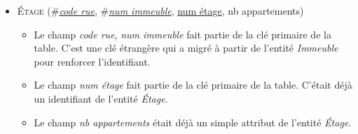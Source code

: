 \documentclass[a4paper]{article}
\newcommand{\relat}[1]{\textsc{#1}}
\newcommand{\attr}[1]{#1}
\newcommand{\prim}[1]{\uline{#1}}
\newcommand{\foreign}[1]{\#\textsl{#1}}
\begin{document}
\begin{itemize}
  \item \relat{Étage} (\foreign{\prim{code rue}}, \foreign{\prim{num immeuble}}, \prim{num étage}, \attr{nb appartements})
  \begin{itemize}
    \item Le champ \emph{code rue}, \emph{num immeuble} fait partie de la clé primaire de la table. C'est une clé étrangère qui a migré à partir de l'entité \emph{Immeuble} pour renforcer l'identifiant.
    \item Le champ \emph{num étage} fait partie de la clé primaire de la table. C'était déjà un identifiant de l'entité \emph{Étage}.
    \item Le champ \emph{nb appartements} était déjà un simple attribut de l'entité \emph{Étage}.
  \end{itemize}

\end{itemize}
\end{document}
